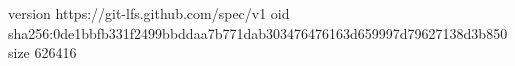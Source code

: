 version https://git-lfs.github.com/spec/v1
oid sha256:0de1bbfb331f2499bbddaa7b771dab303476476163d659997d79627138d3b850
size 626416
